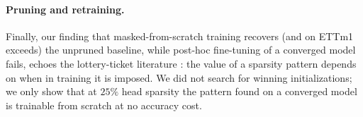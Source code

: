 \paragraph{Pruning and retraining.}
Finally, our finding that masked-from-scratch training recovers (and on
ETTm1 exceeds) the unpruned baseline, while post-hoc fine-tuning of a
converged model fails, echoes the lottery-ticket literature
\citep{frankle2019lottery}: the value of a sparsity pattern depends on when
in training it is imposed. We did not search for winning initializations;
we only show that at $25\%$ head sparsity the pattern found on a converged
model is trainable from scratch at no accuracy cost.
